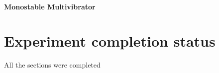 \documentclass[12pt]{article}
\begin{document}
\begin{figure}[H]
    \begin{center}
  \end{center}
  \end{figure}

  \textbf{\large Monostable Multivibrator}
  \begin{figure}[H]
    \begin{center}
  \end{center}
  \end{figure}

\section{Experiment completion status}
All the sections were completed
\end{document}
